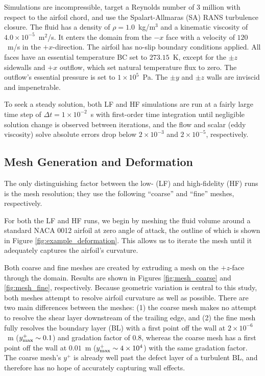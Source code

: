 \documentclass[11pt]{article}
\begin{document}
Simulations are incompressible, target a Reynolds number of 3 million with respect to the airfoil chord, and use the Spalart-Allmaras (SA) RANS turbulence closure. The fluid has a density of $\rho = 1.0$~kg/m$^3$ and a kinematic viscosity of $4.0 \times 10^{-5}$~m$^2$/s. It enters the domain from the $-x$ face with a velocity of $120$~m/s in the $+x$-direction. The airfoil has no-slip boundary conditions applied. All faces have an essential temperature BC set to $273.15$~K, except for the $\pm z$ sidewalls and $+x$ outflow, which set natural temperature flux to zero. The outflow's essential pressure is set to $1\times 10^{5}$~Pa. The $\pm y$ and $\pm z$ walls are inviscid and impenetrable.

To seek a steady solution, both LF and HF simulations are run at a fairly large time step of $\Delta t = 1 \times 10^{-2}$~s with first-order time integration until negligible solution change is observed between iterations, and the flow and scalar (eddy viscosity) solve absolute errors drop below $2 \times 10^{-3}$ and $2 \times 10^{-5}$, respectively.

\subsection{Mesh Generation and Deformation}

The only distinguishing factor between the low- (LF) and high-fidelity (HF) runs is the mesh resolution; they use the following ``coarse'' and ``fine'' meshes, respectively.

For both the LF and HF runs, we begin by meshing the fluid volume around a standard NACA 0012 airfoil at zero angle of attack, the outline of which is shown in Figure \ref{fig:example_deformation}. This allows us to iterate the mesh until it adequately captures the airfoil's curvature.

Both coarse and fine meshes are created by extruding a mesh on the $+z$-face through the domain. Results are shown in Figures \ref{fig:mesh_coarse} and \ref{fig:mesh_fine}, respectively. Because geometric variation is central to this study, both meshes attempt to resolve airfoil curvature as well as possible. There are two main differences between the meshes: (1) the coarse mesh makes no attempt to resolve the shear layer downstream of the trailing edge, and (2) the fine mesh fully resolves the boundary layer (BL) with a first point off the wall at $2\times 10^{-6}$~m ($y^+_{\text{max}} \sim 0.1$) and gradation factor of 0.8, whereas the coarse mesh has a first point off the wall at $0.01$~m ($y^+_{\text{max}} \sim 4 \times 10^4$) with the same gradation factor. The coarse mesh's $y^+$ is already well past the defect layer of a turbulent BL, and therefore has no hope of accurately capturing wall effects.
\end{document}
